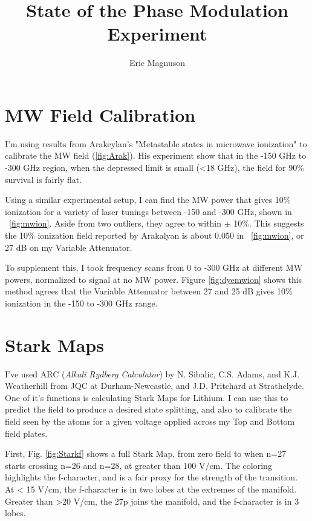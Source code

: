 \documentclass{article}
\begin{document}
\title{State of the Phase Modulation Experiment}
\author{Eric Magnuson}

\maketitle

\section{MW Field Calibration}

I'm using results from Arakeylan's "Metastable states in microwave ionization" to calibrate the MW field (\ref{fig:Arak}). His experiment show that in the -150 GHz to -300 GHz region, when the depressed limit is small (<18 GHz), the field for 90\% survival is fairly flat.

Using a similar experimental setup, I can find the MW power that gives 10\% ionization for a variety of laser tunings between -150 and -300 GHz, shown in ~\ref{fig:mwion}. Aside from two outliers, they agree to within $\pm$ 10\%. This suggests the 10\% ionization field reported by Arakalyan is about 0.050 in ~\ref{fig:mwion}, or 27 dB on my Variable Attenuator.

To supplement this, I took frequency scans from 0 to -300 GHz at different MW powers, normalized to signal at no MW power. Figure \ref{fig:dyemwion} shows this method agrees that the Variable Attenuator between 27 and 25 dB gives 10\% ionization in the -150 to -300 GHz range.

\section{Stark Maps}

I've used ARC (\textit{Alkali Rydberg Calculator}) by N. Sibalic, C.S. Adams, and K.J. Weatherhill from JQC at Durham-Newcastle, and J.D. Pritchard at Strathclyde. One of it's functions is calculating Stark Maps for Lithium. I can use this to predict the field to produce a desired state splitting, and also to calibrate the field seen by the atoms for a given voltage applied across my Top and Bottom field plates.

First, Fig. \ref{fig:Starkf} shows a full Stark Map, from zero field to when n=27 starts crossing n=26 and n=28, at greater than 100 V/cm. The coloring highlights the f-character, and is a fair proxy for the strength of the transition. At < 15 V/cm, the f-character is in two lobes at the extremes of the manifold. Greater than >20 V/cm, the 27p joins the manifold, and the f-character is in 3 lobes.
\end{document}
